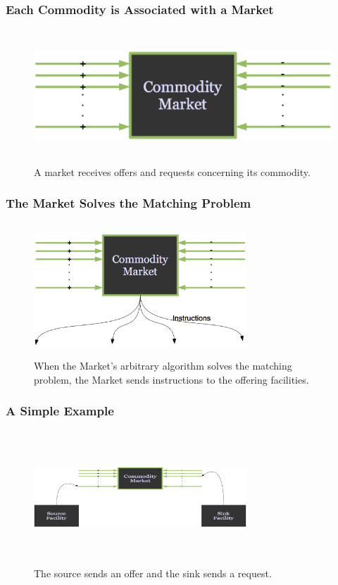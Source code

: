 \documentclass[9pt]{beamer}
\begin{document}
\begin{frame}[ctb!]
  \frametitle{Each Commodity is Associated with a Market}
  \begin{figure}[htbp!]
    \begin{center}
      \includegraphics[height=5cm]{market.eps}
    \end{center}
    \caption{ A market receives offers and requests concerning its 
    commodity. } 
    \label{fig:market}
  \end{figure}
\end{frame}
\begin{frame}[ctb!]
  \frametitle{The Market Solves the Matching Problem}
  \begin{figure}[htbp!]
    \begin{center}
      \includegraphics[height=5cm,width=8cm]{instructions.eps}
    \end{center}
    \caption{ When the Market's arbitrary algorithm solves the 
    matching problem, the Market sends instructions to the offering 
    facilities.} 
    \label{fig:instructions}
  \end{figure}
\end{frame}
\begin{frame}[ctb!]
  \frametitle{A Simple Example}
  \begin{figure}[htbp!]
    \begin{center}
      \includegraphics[height=5cm, width=8cm]{offreq.eps}
    \end{center}
    \caption{ The source sends an offer and the sink sends a request.} 
    \label{fig:offreq}
  \end{figure}
\end{frame}
\end{document}
